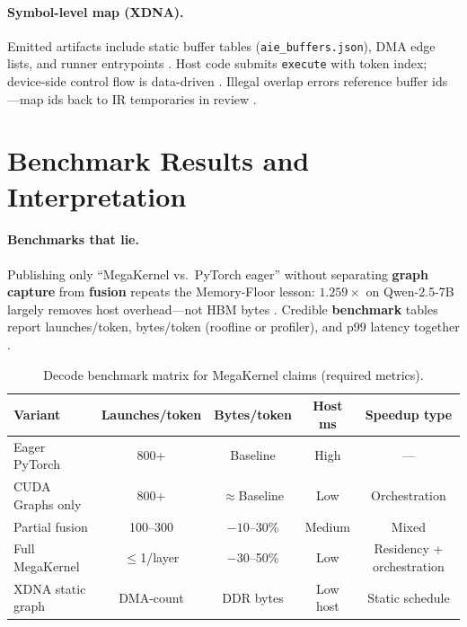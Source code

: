 \paragraph{Symbol-level map (XDNA).} Emitted artifacts include static buffer tables (\texttt{aie\_buffers.json}), DMA edge lists, and runner entrypoints \citep{amd2024aie,amd2024xdna,yirage2026}. Host code submits \texttt{execute} with token index; device-side control flow is data-driven \citep{chen2020compilerbasedhardw,patel2025llminference}. Illegal overlap errors reference buffer ids---map ids back to IR temporaries in review \citep{yirage2026,amd2024aie}.
\section{Benchmark Results and Interpretation}
\label{sec:ch11_benchmark_results}

\paragraph{Benchmarks that lie.} Publishing only ``MegaKernel vs.\ PyTorch eager'' without separating \textbf{graph capture} from \textbf{fusion} repeats the Memory-Floor lesson: $1.259\times$ on Qwen-2.5-7B largely removes host overhead---not HBM bytes \citep{memoryfloor2026}. Credible \textbf{benchmark} tables report launches/token, bytes/token (roofline or profiler), and p99 latency together \citep{taxbreak2026,patel2025llminference}.

\begin{table}[t]
\centering
\caption{Decode benchmark matrix for MegaKernel claims (required metrics).}
\label{tab:ch11_benchmark}
\begin{tabular}{lcccc}
\toprule
\textbf{Variant} & \textbf{Launches/token} & \textbf{Bytes/token} & \textbf{Host ms} & \textbf{Speedup type} \\
\midrule
Eager PyTorch & 800+ & Baseline & High & --- \\
CUDA Graphs only & 800+ & $\approx$Baseline & Low & Orchestration \\
Partial fusion & 100--300 & $-10$--30\% & Medium & Mixed \\
Full MegaKernel & $\leq$1/layer & $-30$--50\% & Low & Residency + orchestration \\
XDNA static graph & DMA-count & DDR bytes & Low host & Static schedule \\
\bottomrule
\end{tabular}
\end{table}

